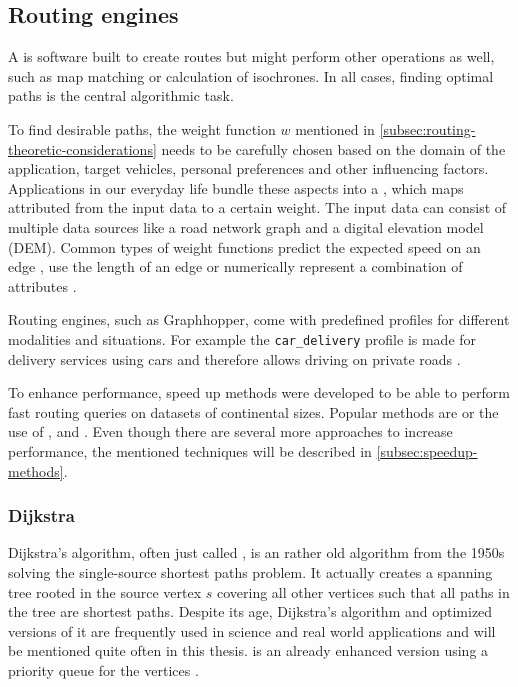 	\subsection{Routing engines}
		
		A  is software built to create routes but might perform other operations as well, such as map matching or calculation of isochrones.
		In all cases, finding optimal paths is the central algorithmic task.
		
		To find desirable paths, the weight function $w$ mentioned in \cref{subsec:routing-theoretic-considerations} needs to be carefully chosen based on the domain of the application, target vehicles, personal preferences and other influencing factors.
		Applications in our everyday life bundle these aspects into a , which maps attributed from the input data to a certain weight.
		The input data can consist of multiple data sources like a road network graph and a digital elevation model (DEM).
		Common types of weight functions predict the expected speed on an edge \cite{graphhopper-profile-bike-speeds}, use the length of an edge \cite{graphhopper-profile-shortest} or numerically represent a combination of attributes \cite{graphhopper-profile-short-fastest}.
		
		Routing engines, such as Graphhopper, come with predefined profiles for different modalities and situations.
		For example the \texttt{car\_delivery} profile is made for delivery services using cars and therefore allows driving on private roads \cite{graphhopper-routing-profiles}.
		
		To enhance performance, speed up methods were developed to be able to perform fast routing queries on datasets of continental sizes.
		Popular methods are  or the use of ,  and .
		Even though there are several more approaches to increase performance, the mentioned techniques will be described in \cref{subsec:speedup-methods}.
		
		\subsubsection{Dijkstra}
		\label{subsubsec:dijkstra}
		
			Dijkstra's algorithm, often just called , is an rather old algorithm from the 1950s solving the single-source shortest paths problem.
			It actually creates a spanning tree rooted in the source vertex $s$ covering all other vertices such that all paths in the tree are shortest paths.
			Despite its age, Dijkstra's algorithm and optimized versions of it are frequently used in science and real world applications and will be mentioned quite often in this thesis.
			 is an already enhanced version using a priority queue for the vertices \cite[658]{cormen-introduction-to-alg}.
			
